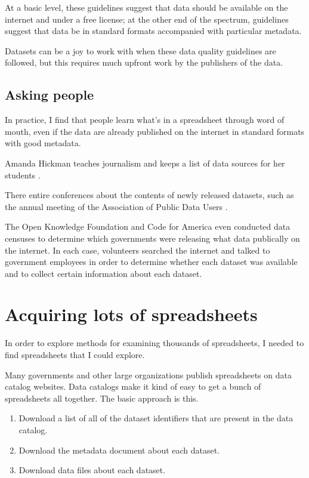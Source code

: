 \documentclass{acm_proc_article-sp}
\begin{document}
At a basic level, these guidelines suggest that data should
be available on the internet and under a free license; at the other
end of the spectrum, guidelines suggest that data be in standard
formats accompanied with particular metadata.

Datasets can be a joy to work with when these data quality guidelines
are followed, but this requires much upfront work by the publishers
of the data.

\subsection{Asking people}
In practice, I find that people learn what's in a spreadsheet through word
of mouth, even if the data are already published on the internet in standard
formats with good metadata.

Amanda Hickman teaches journalism and keeps a list of data sources for her
students \cite{amanda}.

There entire conferences about the contents of newly released datasets,
such as the annual meeting of the Association of Public Data Users \cite{apdu}.

The Open Knowledge Foundation \cite{open-data-census}
and Code for America \cite{open-data-census-us}
even conducted data censuses to determine which governments were
releasing what data publically on the internet.
In each case, volunteers searched the internet and talked to
government employees in order to determine whether each dataset was
available and to collect certain information about each dataset.

\section{Acquiring lots of spreadsheets} \label{acquire}
In order to explore methods for examining thousands of spreadsheets,
I needed to find spreadsheets that I could explore.

Many governments and other large organizations publish spreadsheets on
data catalog websites.
Data catalogs make it kind of easy to get a bunch of spreadsheets all together.
The basic approach is this.

\begin{enumerate}
\setlength{\itemsep}{0pt}
\item Download a list of all of the dataset identifiers that are present in the data catalog.
\item Download the metadata document about each dataset.
\item Download data files about each dataset.
\end{enumerate}
\end{document}
